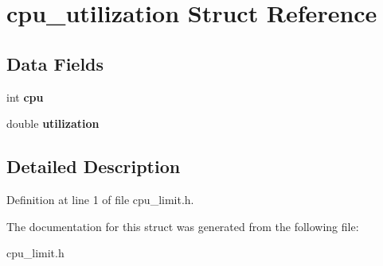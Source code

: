 \hypertarget{structcpu__utilization}{
\section{cpu\_\-utilization Struct Reference}
\label{structcpu__utilization}
}
\subsection*{Data Fields}
\begin{DoxyCompactItemize}
\item 
\hypertarget{structcpu__utilization_a41a58b7c4446ab1abce89f43531cd523}{
int {\bfseries cpu}}
\label{structcpu__utilization_a41a58b7c4446ab1abce89f43531cd523}

\item 
\hypertarget{structcpu__utilization_aaeec171fb246a7d88e1f2f54f7ddab80}{
double {\bfseries utilization}}
\label{structcpu__utilization_aaeec171fb246a7d88e1f2f54f7ddab80}

\end{DoxyCompactItemize}


\subsection{Detailed Description}


Definition at line 1 of file cpu\_\-limit.h.

The documentation for this struct was generated from the following file:\begin{DoxyCompactItemize}
\item 
cpu\_\-limit.h\end{DoxyCompactItemize}
